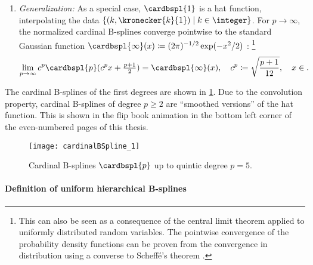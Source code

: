 \begin{enumerate}
  \item
  \emph{Generalization:}
  As a special case, $\cardbspl{1}$ is a hat function,
  interpolating the data
  $\{(k, \kronecker{k}{1}) \mid k \in \integer\}$.
  For $p \to \infty$, the normalized cardinal B-splines converge
  pointwise to the standard Gaussian function
  $\cardbspl{\infty}(x) \ceq (2\pi)^{-1/2} \exp(-x^2/2)$ \cite{Unser92Asymptotic}:%
  \footnote{%
    This can also be seen as a consequence of the central limit theorem
    applied to uniformly distributed random variables.
    The pointwise convergence of the probability density functions
    can be proven from the convergence
    in distribution using a converse to Scheffé's theorem
    \cite{Boos85Converse}.%
  }
  \vspace{-0.5em}
  \begin{equation}
    \lim_{p \to \infty}
    c^p \cardbspl{p}(c^p x + \tfrac{p+1}{2})
    = \cardbspl{\infty}(x),\quad
    c^p \ceq \sqrt{\frac{p+1}{12}},\quad
    x \in \real.
  \end{equation}
\end{enumerate}

The cardinal B-splines of the first degrees are shown in
\cref{fig:cardinalBSpline}.
Due to the convolution property,
cardinal B-splines of degree $p \ge 2$ are ``smoothed versions''
of the hat function.
This is shown in the flip book animation in the bottom left corner
of the even-numbered pages of this thesis.

\begin{figure}
  \texttt{[image: cardinalBSpline\_1]}%
  \caption[%
    Cardinal B-splines%
  ]{%
    Cardinal B-splines $\cardbspl{p}$ up to quintic degree $p = 5$.%
  }%
  \label{fig:cardinalBSpline}%
\end{figure}

\paragraph{Definition of uniform hierarchical B-splines}

